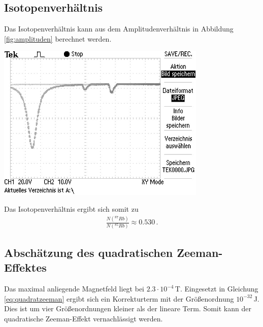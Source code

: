 \documentclass[]{scrartcl}
\begin{document}
\subsection{Isotopenverhältnis}
Das Isotopenverhältnis kann aus dem Amplitudenverhältnis in Abbildung \ref{fig:amplituden} berechnet werden.
\begin{center}
	\includegraphics[width=10cm]{images/Isotopenverhaeltnis.JPG}
	\label{fig:amplituden}
\end{center}
Das Isotopenverhältnis ergibt sich somit zu
\begin{align*}
\frac{N(^{87}Rb)}{N(^{85}Rb)}\approx0.530\,.
\end{align*}

\subsection{Abschätzung des quadratischen Zeeman-Effektes}
Das maximal anliegende Magnetfeld liegt bei $2.3\cdot10^{-4}$\,T. Eingesetzt in Gleichung \ref{eq:quadratzeeman} ergibt sich ein Korrekturterm mit der Größenordnung $10^{-32}$\,J. Dies ist um vier Grö\ss enordnungen kleiner als der lineare Term. Somit kann der quadratische Zeeman-Effekt vernachlässigt werden. 
\end{document}
